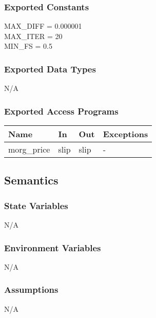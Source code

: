 \documentclass[12pt, titlepage]{article}
\begin{document}
\subsubsection{Exported Constants}
MAX\_DIFF = 0.000001\\
MAX\_ITER = 20\\
MIN\_FS = 0.5\\

\subsubsection{Exported Data Types}
N/A

\subsubsection{Exported Access Programs}

\begin{center}
	\renewcommand*{\arraystretch}{1.5}
	\begin{tabular} {p{}  p{}  p{} 
			p{} } \hline 
		\textbf{Name} & \textbf{In} & \textbf{Out} & \textbf{Exceptions} \\ 
		\hline

  morg\_price & slip & slip & - \\ \hline
\end{tabular}
\end{center}

\subsection{Semantics}

\subsubsection{State Variables}
N/A

\subsubsection{Environment Variables}
N/A

\subsubsection{Assumptions}
N/A
 
\end{document}
